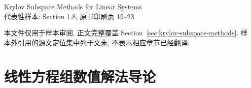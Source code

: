 \documentclass[a4paper,UTF8,12pt]{ctexart}
\begin{document}
\begin{center}
{\Large Krylov Subspace Methods for Linear Systems}\\[0.5em]
代表性样本: Section 1.8, 原书印刷页 19--23
\end{center}
\noindent 本文件仅用于样本审阅. 正文完整覆盖 Section~\ref{sec:krylov-subspace-methods}.
样本外引用的源文定位集中列于文末, 不表示相应章节已经翻译.
\section{线性方程组数值解法导论}\label{chap:linear-systems-introduction}
\setcounter{subsection}{7}
\setcounter{equation}{19}
\setcounter{table}{1}
\setcounter{footnote}{4}

\clearpage

\end{document}
